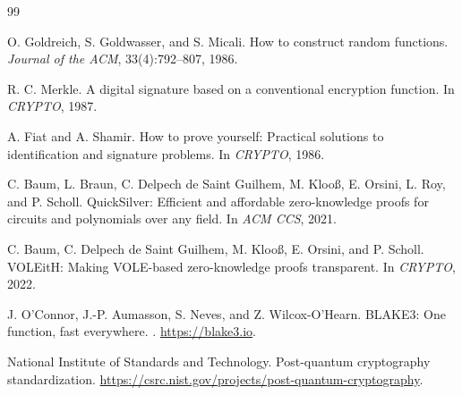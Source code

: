 \documentclass[11pt,a4paper]{article}
\begin{document}
\begin{thebibliography}{99}

O. Goldreich, S. Goldwasser, and S. Micali.
\newblock How to construct random functions.
\newblock \emph{Journal of the ACM}, 33(4):792--807, 1986.

R. C. Merkle.
\newblock A digital signature based on a conventional encryption function.
\newblock In \emph{CRYPTO}, 1987.

A. Fiat and A. Shamir.
\newblock How to prove yourself: Practical solutions to identification and
signature problems.
\newblock In \emph{CRYPTO}, 1986.

C. Baum, L. Braun, C. Delpech de Saint Guilhem, M. Kloo\ss,
E. Orsini, L. Roy, and P. Scholl.
\newblock QuickSilver: Efficient and affordable zero-knowledge proofs for
circuits and polynomials over any field.
\newblock In \emph{ACM CCS}, 2021.

C. Baum, C. Delpech de Saint Guilhem, M. Kloo\ss, E. Orsini, and P. Scholl.
\newblock VOLEitH: Making VOLE-based zero-knowledge proofs transparent.
\newblock In \emph{CRYPTO}, 2022.

J. O'Connor, J.-P. Aumasson, S. Neves, and Z. Wilcox-O'Hearn.
\newblock BLAKE3: One function, fast everywhere.
. \url{https://blake3.io}.

National Institute of Standards and Technology.
\newblock Post-quantum cryptography standardization.
\newblock \url{https://csrc.nist.gov/projects/post-quantum-cryptography}.

\end{thebibliography}
\end{document}
